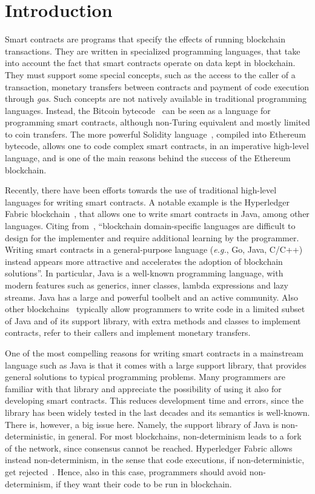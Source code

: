 \section{Introduction}\label{sec:introduction}

Smart contracts are programs that specify the effects of running blockchain transactions.
They are written in specialized programming languages, that take into account
the fact that smart contracts operate on data kept in blockchain. They must
support some special concepts, such as the access to the caller of a transaction,
monetary transfers between contracts
and payment of code execution through \emph{gas}.
Such concepts are not natively available
in traditional programming languages.
Instead, the Bitcoin bytecode~\cite{Antonopoulos17,Nakamoto08}
can be seen as a language for programming smart contracts,
although non-Turing equivalent and mostly limited to coin transfers. The more
powerful Solidity language~\cite{AntonopoulosW18},
compiled into Ethereum bytecode, allows one to code
complex smart contracts, in an imperative high-level language, and is
one of the main reasons behind the success of the Ethereum blockchain.

Recently, there have been efforts towards the use of traditional
high-level languages for writing smart contracts.
A notable example is the Hyperledger Fabric blockchain~\cite{AndroulakiBBCCC18,Vukolic17}, that allows one
to write smart contracts in Java, among other languages. Citing from~\cite{AndroulakiBBCCC18},
``blockchain domain-specific languages are difficult to design for the implementer
and require additional learning by the programmer. Writing smart contracts
in a general-purpose language (\emph{e.g.}, Go, Java, C/C++) instead
appears more attractive and accelerates the adoption of blockchain solutions''.
In particular, Java is a well-known programming language,
with modern features such as generics, inner classes, lambda
expressions and lazy streams. Java has
a large and powerful toolbelt and an active community.
Also other blockchains~\cite{aion,aion_example_contract,neo,neo_contract,Spoto19}
typically allow programmers to write code in a limited subset of Java
and of its support library,
with extra methods and classes to implement contracts, refer to their
callers and implement monetary transfers.

One of the most compelling reasons for writing smart contracts
in a mainstream language such as Java is that it comes with a large
support library, that provides general solutions to typical programming problems.
Many programmers are familiar with that library and appreciate the possibility
of using it also for developing smart contracts. This reduces
development time and errors, since the library has been widely tested
in the last decades and its semantics is well-known. There is, however, a big
issue here. Namely, the support library of Java is non-deterministic, in general.
For most blockchains, non-determinism leads to a fork of the network, since
consensus cannot be reached. Hyperledger Fabric allows instead non-determinism,
in the sense that code executions, if non-deterministic, get rejected~\cite{Vukolic17}.
Hence, also in this case, programmers should avoid non-determinism, if they want their code to be
run in blockchain.

